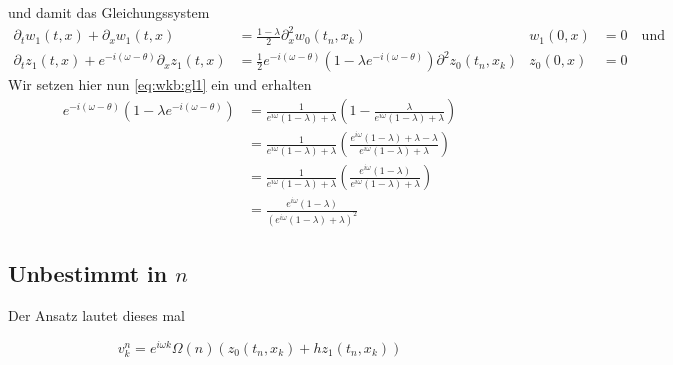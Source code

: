 und damit das Gleichungssystem
{\small
\begin{align}\label{eq:exp:oh2}
\partial_t w_1(t,x) + \partial_x w_1(t,x) &= \frac {1-\lambda}{2} \partial^2_x w_0(t_n, x_k) &w_1(0,x) &= 0 \quad \text{und}\\
\partial_t z_1(t,x) + e^{-i (\omega - \theta)} \partial_x z_1(t,x) &= \frac{1}{2} e^{- i(\omega - \theta)} \left(1 - \lambda e^{-i(\omega - \theta)} \right) \partial^2 z_0(t_n, x_k) &z_0(0,x) &= 0 
\end{align}}
Wir setzen hier nun \eqref{eq:wkb:gl1} ein und erhalten
\begin{align*}
e^{- i(\omega - \theta)} \left(1 - \lambda e^{-i(\omega - \theta)} \right) &= \frac{1}{ e^{i \omega} (1 -  \lambda) + \lambda } \left( 1 - \frac{\lambda}{ e^{i \omega} (1 -  \lambda) + \lambda } \right)\\
&= \frac{1}{ e^{i \omega} (1 -  \lambda) + \lambda } \left( \frac{e^{i \omega} (1 -  \lambda) + \lambda - \lambda}{ e^{i \omega} (1 -  \lambda) + \lambda } \right)\\
&= \frac{1}{ e^{i \omega} (1 -  \lambda) + \lambda } \left( \frac{e^{i \omega} (1 -  \lambda) }{ e^{i \omega} (1 -  \lambda) + \lambda } \right)\\
&= \frac{e^{i \omega} (1 -  \lambda) }{ \left(e^{i \omega} (1 -  \lambda) + \lambda \right)^2 }
\end{align*}

\subsection*{Unbestimmt in $n$}

Der Ansatz lautet dieses mal 

\[ v^n_k = e^{i \omega k} \Omega(n) \left( z_0(t_n, x_k) + h z_1(t_n, x_k) \right) \]

